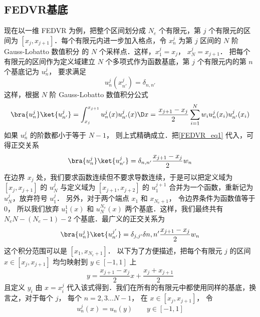 

\subsection{FEDVR基底}

现在以一维 FEDVR 为例，把整个区间划分成 $N_e$ 个有限元，第 $j$ 个有限元的区间为 $[x_j,x_{j+1}]$．每个有限元内进一步加入格点，令 $x_n^j$ 为第 $j$ 区间的 $N$ 阶 Gauss-Lobatto 数值积分 %
的 $N$ 个采样点．这样，$x_1^j=x_j$，  $x_N^j=x_{j+1}$． 把每个有限元的区间作为定义域建立 $N$ 个多项式作为函数基底，第 $j$ 个有限元内的第 $n$ 个基底记为 $u_n^j$， 要求满足
\begin{equation}\label{FEDVR_eq1}
u_n^j(x_{n'}^j) = \delta_{n,n'}
\end{equation}
这样，根据 $N$ 阶 Gauss-Lobatto 数值积分公式
\begin{equation}
\bra{u_n^j}\ket{u_{n'}^j} = \int_{x_j}^{x_{j+1}} u_n^j(x) u_{n'}^j(x) \D x = \frac{x_{j+1}-x_j}{2} \sum_{i=1}^{N} w_i u_n^j(x_i) u_{n'}^j (x_i)
\end{equation}
如果 $u_n^j$ 的阶数都小于等于 $N-1$， 则上式精确成立．把\autoref{FEDVR_eq1} 代入，可得正交关系
\begin{equation}
\bra{u_n^j}\ket{u_{n'}^j} = \delta_{n,n'} \frac{x_{j+1}-x_j}{2} w_n
\end{equation}
在边界 $x_j$ 处，我们要求函数连续但不要求导数连续，于是可以把定义域为 $[x_j,x_{j+1}]$ 的 $u_N^j$  与定义域为 $[x_{j+1},x_{j+2}]$ 的 $u_1^{j+1}$ 合并为一个函数，重新记为 $u_N^j$，放弃符号 $u_1^j$． 另外，对于两个端点 $x_1$ 和 $x_{N_e+1}$， 令边界条件为函数值等于 0， 所以我们放弃 $u_1^1(x)$ 和 $u_N^{N_e}(x)$ 两个基底．这样，我们最终共有 $N_eN-(N_e-1)-2$ 个基底．最广义的正交关系为
\begin{equation}
\bra{u_n^j}\ket{u_{n'}^{j'}} = \delta_{j,j'}\delta{n,n'} \frac{x_{j+1}-x_j}{2}w_n
\end{equation}
这个积分范围可以是 $[x_1, x_{N_e+1}]$． 以下为了方便描述，把每个有限元 $j$ 的区间 $ x\in[x_j,x_{j+1}]$ 均匀映射到 $y\in[-1,1]$ 上
\begin{equation}
y = \frac{x_{j+1}-x_j}{2} x + \frac{x_j+x_{j+1}}{2}
\end{equation}
且定义 $y_i$ 由 $x=x_i^j$ 代入该式得到．我们在所有的有限元中都使用同样的基底，换言之，对于每个 $j$， 每个 $n=2,3\dots N-1$， 在 $x\in[x_j,x_{j+1}]$， 令
\begin{equation}
u_n^j(x) = u_n(y) \qquad y\in[-1,1]
\end{equation}
